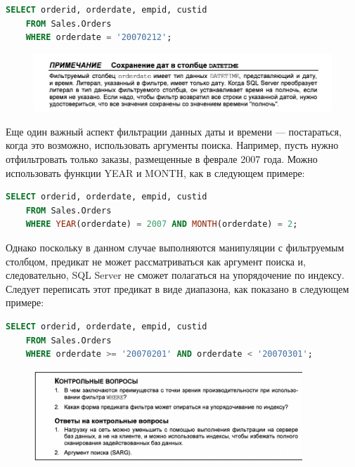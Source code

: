 \begin{lstlisting}[label=lst:funcReturn, caption=Пример работы с фильтрацией даты, language=sql]
	SELECT orderid, orderdate, empid, custid
	FROM Sales.Orders
	WHERE orderdate = '20070212';
\end{lstlisting}


\begin{figure}[h!]
	\begin{center}
		\includegraphics[width=1\textwidth]{img/advice5.png}
	\end{center}
	\captionsetup{justification=centering}
\end{figure}


Еще один важный аспект фильтрации данных даты и времени — постараться, когда это возможно, использовать аргументы поиска. Например, пусть нужно отфильтровать только заказы, размещенные в феврале 2007 года. Можно использовать функции YEAR и MONTH, как в следующем примере: 

\begin{lstlisting}[label=lst:funcReturn, caption=Пример работы с фильтрацией даты без аргумента поиска, language=sql]
	SELECT orderid, orderdate, empid, custid
	FROM Sales.Orders
	WHERE YEAR(orderdate) = 2007 AND MONTH(orderdate) = 2;
\end{lstlisting}

Однако поскольку в данном случае выполняются манипуляции с фильтруемым столбцом, предикат не может рассматриваться как аргумент поиска и, следовательно, SQL Server не сможет полагаться на упорядочение по индексу. Следует переписать этот предикат в виде диапазона, как показано в следующем примере: 

\begin{lstlisting}[label=lst:funcReturn, caption=Пример работы с фильтрацией даты с аргументом поиска, language=sql]
	SELECT orderid, orderdate, empid, custid
	FROM Sales.Orders
	WHERE orderdate >= '20070201' AND orderdate < '20070301';	
\end{lstlisting}

\begin{figure}[h!]
	\begin{center}
		\includegraphics[width=0.9\textwidth]{img/control8.png}
	\end{center}
	\captionsetup{justification=centering}
\end{figure}

